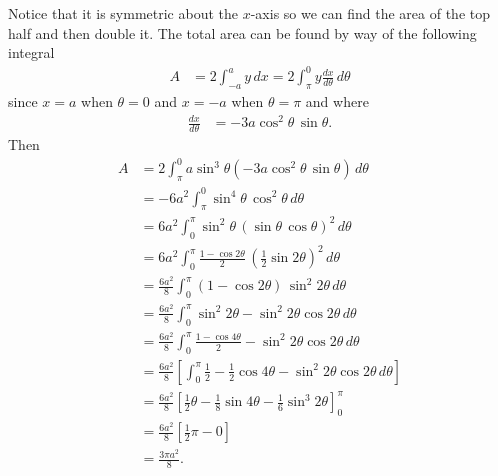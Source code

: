 \documentclass[12pt]{article}
\begin{document}
\begin{center}
\end{center}
Notice that it is symmetric about the $x$-axis so we can find the area of the top half and then double it. The total area can be found by way of the following integral
\begin{align}
  A &= 2 \int_{-a}^{a} y \, dx = 2 \int_{\pi}^{0} y \frac{dx}{d\theta} \, d\theta
\end{align}
since $x = a$ when $\theta = 0$ and $x = -a$ when $\theta = \pi$ and where
\begin{align}
  \frac{dx}{d\theta} &= - 3a \cos^2 \theta \, \sin \theta.
\end{align}
Then
\begin{align}
  A &= 2 \int_\pi^0 a \sin^3 \theta \left( - 3a \cos^2 \theta \, \sin \theta \right) \, d\theta \\
    &= -6a^2 \int_\pi^0 \sin^4 \theta \, \cos^2 \theta \, d\theta \\
    &= 6a^2 \int_0^\pi \sin^2 \theta \, \left(\sin \theta \, \cos \theta\right)^2 \, d\theta \\
    &= 6a^2 \int_0^\pi \frac{1 - \cos 2\theta}{2} \, \left(\frac{1}{2} \sin 2\theta\right)^2 \, d\theta \\
    &= \frac{6a^2}{8} \int_0^\pi \left( 1 - \cos 2\theta \right) \, \sin^2 2\theta \, d\theta \\
    &= \frac{6a^2}{8} \int_0^\pi \sin^2 2\theta - \sin^2 2\theta \cos 2\theta \, d\theta \\
    &= \frac{6a^2}{8} \int_0^\pi \frac{1 - \cos 4\theta}{2} - \sin^2 2\theta \cos 2\theta \, d\theta \\
    &= \frac{6a^2}{8} \left[ \int_0^\pi \frac{1}{2} - \frac{1}{2}\cos 4\theta - \sin^2 2\theta \cos 2\theta \, d\theta \right] \\
    &= \frac{6a^2}{8} \left[\frac{1}{2} \theta - \frac{1}{8}\sin 4\theta - \frac{1}{6} \sin^3 2\theta \right]_0^\pi \\
    &= \frac{6a^2}{8} \left[\frac{1}{2} \pi - 0 \right] \\
    &= \frac {3 \pi a^2}{8}.
  \end{align}
\end{document}
